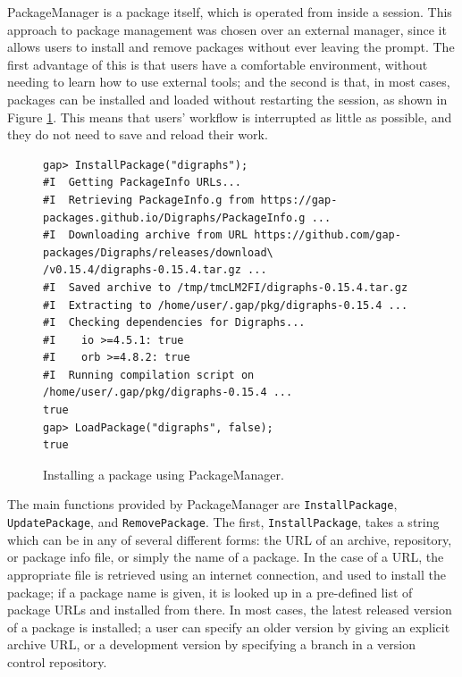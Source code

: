 \documentclass{deliverablereport}
\begin{document}
{\sf PackageManager} is a \GAP package itself, which is operated from inside a
\GAP session.  This approach to package management was chosen over an external
manager, since it allows users to install and remove packages without ever
leaving the \GAP prompt.  The first advantage of this is that
users have a comfortable environment, without needing to learn how to use
external tools; and the second is that, in most cases, packages can be installed
and loaded without restarting the session, as shown in Figure \ref{fig:pkgman-sample}.
This means that users' workflow is interrupted as little as possible, and they do
not need to save and reload their work.

\begin{figure}[!ht]
    \centering
    {\tiny
\begin{verbatim}
gap> InstallPackage("digraphs");
#I  Getting PackageInfo URLs...
#I  Retrieving PackageInfo.g from https://gap-packages.github.io/Digraphs/PackageInfo.g ...
#I  Downloading archive from URL https://github.com/gap-packages/Digraphs/releases/download\
/v0.15.4/digraphs-0.15.4.tar.gz ...
#I  Saved archive to /tmp/tmcLM2FI/digraphs-0.15.4.tar.gz
#I  Extracting to /home/user/.gap/pkg/digraphs-0.15.4 ...
#I  Checking dependencies for Digraphs...
#I    io >=4.5.1: true
#I    orb >=4.8.2: true
#I  Running compilation script on /home/user/.gap/pkg/digraphs-0.15.4 ...
true
gap> LoadPackage("digraphs", false);
true
\end{verbatim}
    }
    \caption{Installing a package using {\sf PackageManager}.}
    \label{fig:pkgman-sample}
\end{figure}

The main functions provided by {\sf PackageManager} are \texttt{InstallPackage},
\texttt{UpdatePackage}, and \texttt{RemovePackage}.  The first,
\texttt{InstallPackage}, takes a string which can be in any of several different
forms: the URL of an archive, repository, or package info file, or simply the
name of a package.  In the case of a URL, the appropriate file is retrieved
using an internet connection, and used to install the package; if a package name
is given, it is looked up in a pre-defined list of package URLs and installed
from there.  In most cases, the latest released version of a package is
installed; a user can specify an older version by giving an explicit archive
URL, or a development version by specifying a branch in a
version control repository.  %
\end{document}

